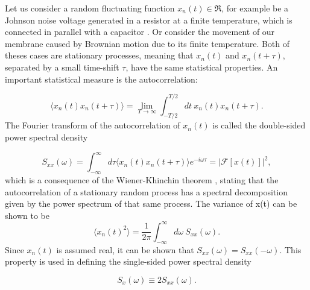Let us consider a random fluctuating function $x_n(t) \in \Re$, for example be a Johnson noise voltage generated in a resistor at a finite temperature, which is connected in parallel with a capacitor \cite{davenportroot}. Or consider the movement of our membrane caused by Brownian motion due to its finite temperature. Both of theses cases are stationary processes, meaning that $x_n(t)$ and $x_n(t + \tau)$, separated by a small time-shift $\tau$, have the same statistical properties. An important statistical measure is the autocorrelation:

\begin{equation}
\langle x_n(t)x_n(t + \tau)\rangle = \lim_{T \to \infty}\int_{-T/2}^{T/2}dt~x_n(t)x_n(t + \tau).
\end{equation}
\noindent
The Fourier transform of the autocorrelation of $x_n(t)$ is called the double-sided power spectral density

\begin{equation}
S_{xx}(\omega) = \int_{-\infty}^{\infty}d\tau\langle x_n(t)x_n(t + \tau)\rangle e^{-i\omega \tau} = \left|\mathcal{F}[x(t)]\right|^2,
\label{eq:PSD}
\end{equation}
\noindent
which is a consequence of the Wiener-Khinchin theorem \cite{riley2006}, stating that the autocorrelation of a stationary random process has a spectral decomposition given by the power spectrum of that same process. The variance of x(t) can be shown to be
\begin{equation}
\langle x_n(t)^2 \rangle = \frac{1}{2\pi}\int_{-\infty}^{\infty}d\omega~S_{xx}(\omega).
\label{eq:inverse_ft}
\end{equation}
\noindent
Since $x_n(t)$ is assumed real, it can be shown that $S_{xx}(\omega) = S_{xx}(-\omega)$. This property is used in defining the single-sided power spectral density

\begin{equation}
S_x(\omega) \equiv 2S_{xx}(\omega).
\end{equation}